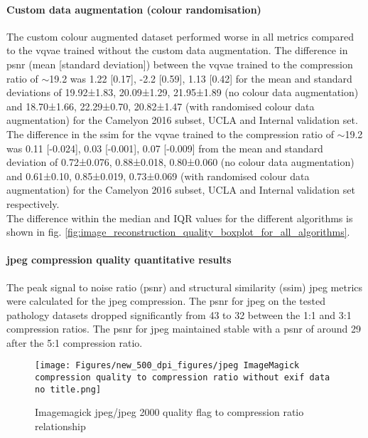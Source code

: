 \documentclass[review]{elsarticle}
\begin{document}
\paragraph{Custom data augmentation (colour randomisation)}  The custom colour augmented dataset performed worse in all metrics compared to the \gls{vqvae} trained without the custom data augmentation. The difference in \gls{psnr} (mean [standard deviation]) between the \gls{vqvae} trained to the compression ratio of $\sim$19.2 was 1.22 [0.17], -2.2 [0.59], 1.13 [0.42] for the mean and standard deviations of 19.92±1.83, 20.09±1.29, 21.95±1.89 (no colour data augmentation) and 18.70±1.66, 22.29±0.70, 20.82±1.47 (with randomised colour data augmentation) for the Camelyon 2016 subset, UCLA and Internal validation set. The difference in the \gls{ssim} for the \gls{vqvae} trained to the compression ratio of $\sim$19.2 was 0.11 [-0.024], 0.03 [-0.001], 0.07 [-0.009] from the mean and standard deviation of 0.72±0.076, 0.88±0.018, 0.80±0.060 (no colour data augmentation) and 0.61±0.10, 0.85±0.019, 0.73±0.069 (with randomised colour data augmentation) for the Camelyon 2016 subset, UCLA and Internal validation set respectively. \\
The difference within the median and IQR values for the different algorithms is shown in fig. \ref{fig:image_reconstruction_quality_boxplot_for_all_algorithms}.

\paragraph{\gls{jpeg} compression quality quantitative results} The peak signal to noise ratio (\gls{psnr}) and structural similarity (\gls{ssim}) \gls{jpeg} metrics were calculated for the \gls{jpeg} compression. The \gls{psnr} for \gls{jpeg} on the tested pathology datasets dropped significantly from 43 to 32 between the 1:1 and 3:1 compression ratios. The \gls{psnr} for \gls{jpeg} maintained stable with a \gls{psnr} of around 29 after the 5:1 compression ratio.

\begin{figure}
\texttt{[image: Figures/new\_500\_dpi\_figures/jpeg ImageMagick compression quality to compression ratio without exif data no title.png]}
\caption{Imagemagick \gls{jpeg}/\gls{jpeg} 2000 quality flag to compression ratio relationship}
\end{figure}
\end{document}
